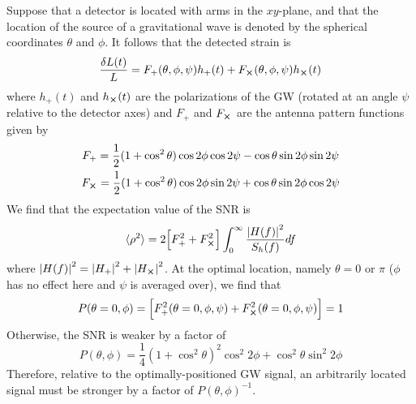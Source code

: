 \documentclass{article}
\begin{document}
Suppose that a detector is located with arms in the $xy$-plane, and that the location of the source of a gravitational wave is denoted by the spherical coordinates $\theta$ and $\phi$. It follows that the detected strain is 
\begin{equation}
    \frac{\delta L(t)}{L} = F_+ (\theta, \phi, \psi) h_+ (t) + F_{\cross} (\theta, \phi, \psi) h_{\cross} (t)
\end{equation}
where $h_+(t)$ and $h_{\cross} (t)$ are the polarizations of the GW (rotated at an angle $\psi$ relative to the detector axes) and $F_+$ and $F_{\cross}$ are the antenna pattern functions given by 
\begin{gather}
    F_+ = \frac{1}{2} (1 + \cos^2 \theta) \cos 2 \phi \cos 2 \psi - \cos \theta \sin 2 \phi \sin 2 \psi \\
    F_{\cross} = \frac{1}{2} (1 + \cos^2 \theta) \cos 2 \phi \sin 2 \psi + \cos \theta \sin 2 \phi \cos 2 \psi
\end{gather}
We find that the expectation value of the SNR is 
\begin{equation}
    \langle \rho^2 \rangle = 2 \Big[ F_+^2 + F_{\cross}^2 \Big] \int_0^\infty \frac{\abs{H(f)}^2}{S_h (f)} df
\end{equation}
where $\abs{H(f)}^2 = \abs{H_+}^2 + \abs{H_{\cross}}^2$. At the optimal location, namely $\theta = 0$ or $\pi$ ($\phi$ has no effect here and $\psi$ is averaged over), we find that 
\begin{equation}
    P(\theta=0, \phi) = \Big[ F_+^2(\theta=0, \phi, \psi) + F_{\cross}^2 (\theta=0, \phi, \psi) \Big] = 1
\end{equation}
Otherwise, the SNR is weaker by a factor of 
\begin{equation}
    P(\theta, \phi) = \frac{1}{4} (1 + \cos^2 \theta)^2 \cos^2 2 \phi + \cos ^2 \theta \sin^2 2 \phi
\end{equation}
Therefore, relative to the optimally-positioned GW signal, an arbitrarily located signal must be stronger by a factor of $P(\theta, \phi)^{-1}$. \\
\end{document}
